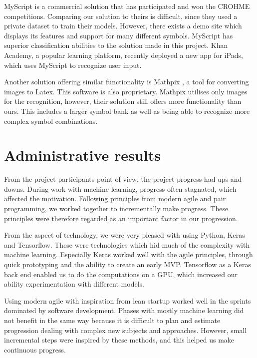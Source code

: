 MyScript is a commercial solution that has participated and won the CROHME competitions. Comparing our solution to theirs is difficult, since they used a private dataset to train their models. However, there exists a demo site which displays its features and support for many different symbols. MyScript has superior classification abilities to the solution made in this project. Khan Academy, a popular learning platform, recently deployed a new app for iPads, which uses MyScript to recognize user input.

Another solution offering similar functionality is Mathpix \cite{mathpix}, a tool for converting images to Latex. This software is also proprietary. Mathpix utilises only images for the recognition, however, their solution still offers more functionality than ours. This includes a larger symbol bank as well as being able to recognize more complex symbol combinations.

\section{Administrative results}

From the project participants point of view, the project progress had ups and downs. During work with machine learning, progress often stagnated, which affected the motivation. Following principles from modern agile and pair programming, we worked together to incrementally make progress. These principles were therefore regarded as an important factor in our progression.

From the aspect of technology, we were very pleased with using Python, Keras and Tensorflow. These were technologies which hid much of the complexity with machine learning. Especially Keras worked well with the agile principles, through quick prototyping and the ability to create an early MVP. Tensorflow as a Keras back end enabled us to do the computations on a GPU, which increased our ability experimentation with different models.

Using modern agile with inspiration from lean startup worked well in the sprints dominated by software development. Phases with mostly machine learning did not benefit in the same way because it is difficult to plan and estimate progression dealing with complex new subjects and approaches. However, small incremental steps were inspired by these methods, and this helped us make continuous progress.

